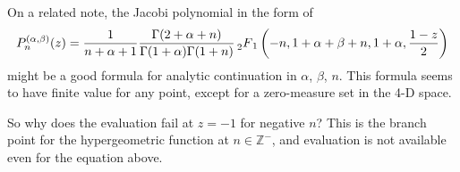 On a related note, the Jacobi polynomial in the form of
\begin{equation}
    P_n^{(\alpha,\beta)}(z) = \frac{1}{n + \alpha + 1} \frac{\Gamma(2 + \alpha + n)}{\Gamma(1 + \alpha) \Gamma(1 + n)} \prescript{}{2}{F}_1\left(-n, 1+\alpha+\beta+n, 1+\alpha, \frac{1-z}{2}\right)
\end{equation}
might be a good formula for analytic continuation in $\alpha$, $\beta$, $n$. This formula seems to have finite value for any point, except for a zero-measure set in the 4-D space.

So why does the evaluation fail at $z=-1$ for negative $n$? This is the branch point for the hypergeometric function at $n\in \mathbb{Z}^-$, and evaluation is not available even for the equation above.
